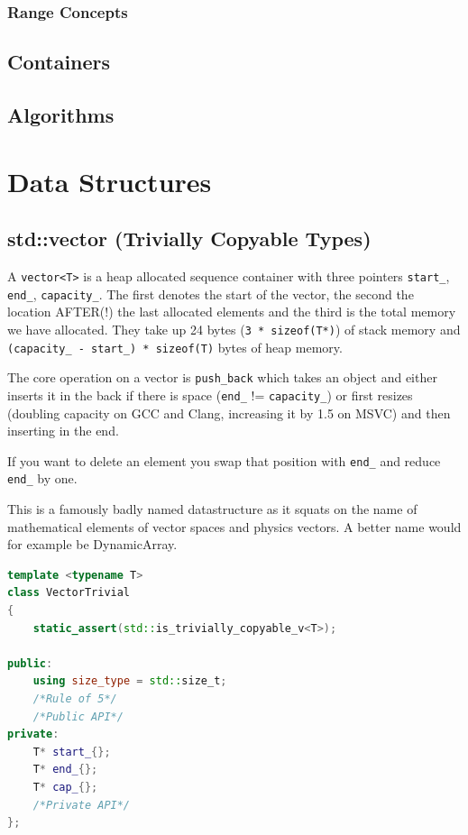 \documentclass{article}
\begin{document}
\subsubsection{Range Concepts}

\subsection{Containers}
\subsection{Algorithms}

\newpage
\section{Data Structures}
\subsection{std::vector (Trivially Copyable Types)}
A \texttt{vector<T>} is a heap allocated sequence container with three pointers \texttt{start\_}, \texttt{end\_}, \texttt{capacity\_}. The first denotes the start of the vector, the second the location AFTER(!) the last allocated elements and the third is the total memory we have allocated. They take up 24 bytes (\texttt{3 * sizeof(T*)}) of stack memory and \texttt{(capacity\_ - start\_) * sizeof(T)} bytes of heap memory.

The core operation on a vector is \texttt{push\_back} which takes an object and either inserts it in the back if there is space (\texttt{end\_} != \texttt{capacity\_}) or first resizes (doubling capacity on GCC and Clang, increasing it by 1.5 on MSVC) and then inserting in the end.

If you want to delete an element you swap that position with \texttt{end\_} and reduce \texttt{end\_} by one.

This is a famously badly named datastructure as it squats on the name of mathematical elements of vector spaces and physics vectors. A better name would for example be DynamicArray.

\begin{lstlisting}[language=cpp,caption={Vector class}]
template <typename T>
class VectorTrivial
{
    static_assert(std::is_trivially_copyable_v<T>);
    
public:
    using size_type = std::size_t;
    /*Rule of 5*/
    /*Public API*/
private:
    T* start_{};
    T* end_{};
    T* cap_{};
    /*Private API*/
};
\end{lstlisting}
\end{document}
